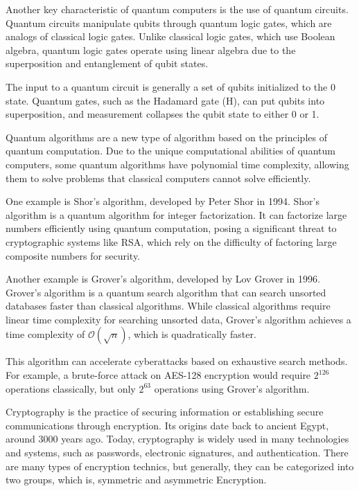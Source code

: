 \documentclass[10pt,twocolumn]{article}          %
\begin{document}
    Another key characteristic of quantum computers is the use of quantum circuits. Quantum circuits manipulate qubits through quantum logic gates, which are analogs of classical logic gates. Unlike classical logic gates, which use Boolean algebra, quantum logic gates operate using linear algebra due to the superposition and entanglement of qubit states.

    The input to a quantum circuit is generally a set of qubits initialized to the 0 state. Quantum gates, such as the Hadamard gate (H), can put qubits into superposition, and measurement collapses the qubit state to either 0 or 1.

    Quantum algorithms are a new type of algorithm based on the principles of quantum computation. Due to the unique computational abilities of quantum computers, some quantum algorithms have polynomial time complexity, allowing them to solve problems that classical computers cannot solve efficiently.

    One example is Shor's algorithm, developed by Peter Shor in 1994. Shor's algorithm is a quantum algorithm for integer factorization. It can factorize large numbers efficiently using quantum computation, posing a significant threat to cryptographic systems like RSA, which rely on the difficulty of factoring large composite numbers for security.

    Another example is Grover's algorithm, developed by Lov Grover in 1996. Grover's algorithm is a quantum search algorithm that can search unsorted databases faster than classical algorithms. While classical algorithms require linear time complexity for searching unsorted data, Grover's algorithm achieves a time complexity of \(\mathcal{O}(\sqrt{n})\), which is quadratically faster.

    This algorithm can accelerate cyberattacks based on exhaustive search methods. For example, a brute-force attack on AES-128 encryption would require \(2^{126}\) operations classically, but only \(2^{63}\) operations using Grover's algorithm.

    Cryptography is the practice of securing information or establishing secure communications through encryption. Its origins date back to ancient Egypt, around 3000 years ago. Today, cryptography is widely used in many technologies and systems, such as passwords, electronic signatures, and authentication.
    There are many types of encryption technics, but generally, they can be categorized into two groups, which is, symmetric and asymmetric Encryption.
\end{document}
